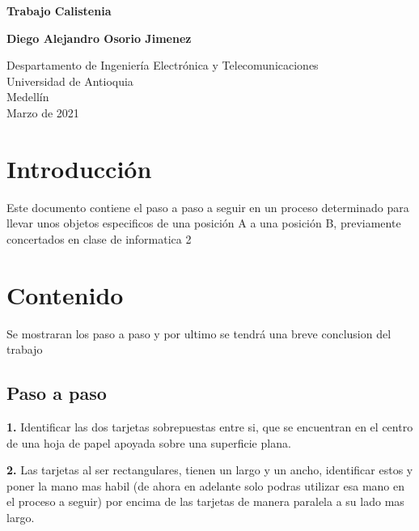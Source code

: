 \documentclass{article}
\begin{document}
\begin{titlepage}
    \begin{center}
        \vspace*{0.5cm}
            
        \Huge
        \textbf{Trabajo Calistenia}
            
        \vspace{2cm}
        \LARGE
        
            
        \vspace{1.5cm}
            
        \textbf{Diego Alejandro Osorio Jimenez}
            
        \vfill
            
        \vspace{0.8cm}
            
        \Large
        Despartamento de Ingeniería Electrónica y Telecomunicaciones\\
        Universidad de Antioquia\\
        Medellín\\
        Marzo de 2021
            
    \end{center}
\end{titlepage}

\tableofcontents
\newpage
\section{Introducción}\label{intro}
Este documento contiene el paso a paso a seguir en un proceso determinado para llevar unos objetos especificos de una posición A a una posición B, previamente concertados en clase de informatica 2

\section{Contenido} \label{contenido}
Se mostraran los paso a paso y por ultimo se tendrá una breve conclusion del trabajo 
\subsection{Paso a paso }
\textbf{1.} Identificar las dos tarjetas sobrepuestas entre si, que se encuentran en el centro de una hoja de papel apoyada sobre una superficie plana.


\textbf{2.} Las tarjetas al ser rectangulares, tienen un largo y un ancho, identificar estos y poner la mano mas habil (de ahora en adelante solo podras utilizar esa mano en el proceso a seguir) por encima de las tarjetas de manera paralela a su lado mas largo.
\end{document}

